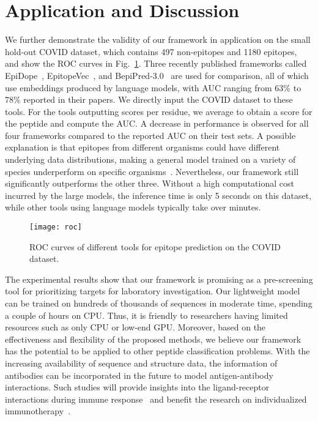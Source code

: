\documentclass[runningheads]{llncs}
\begin{document}
\section{Application and Discussion}
We further demonstrate the validity of our framework in application on the small hold-out COVID dataset, which contains 497 non-epitopes and 1180 epitopes, and show the ROC curves in Fig.~\ref{fig3}. Three recently published frameworks called EpiDope~\cite{collatz2021epidope}, EpitopeVec~\cite{bahai2021epitopevec}, and BepiPred-3.0~\cite{clifford2022bepipred} are used for comparison, all of which use embeddings produced by language models, with AUC ranging from 63\% to 78\% reported in their papers. We directly input the COVID dataset to these tools. For the tools outputting scores per residue, we average to obtain a score for the peptide and compute the AUC. A decrease in performance is observed for all four frameworks compared to the reported AUC on their test sets. A possible explanation is that epitopes from different organisms could have different underlying data distributions, making a general model trained on a variety of species underperform on specific organisms~\cite{ashford2021organism}. Nevertheless, our framework still significantly outperforms the other three. Without a high computational cost incurred by the large models, the inference time is only 5 seconds on this dataset, while other tools using language models typically take over minutes.
\begin{figure}[htbp]
\centerline{\texttt{[image: roc]}}
\caption{ROC curves of different tools for epitope prediction on the COVID dataset.}
\label{fig3}
\end{figure}

The experimental results show that our framework is promising as a pre-screening tool for prioritizing targets for laboratory investigation. Our lightweight model can be trained on hundreds of thousands of sequences in moderate time, spending a couple of hours on CPU. Thus, it is friendly to researchers having limited resources such as only CPU or low-end GPU. Moreover, based on the effectiveness and flexibility of the proposed methods, we believe our framework has the potential to be applied to other peptide classification problems. With the increasing availability of sequence and structure data, the information of antibodies can be incorporated in the future to model antigen-antibody interactions. Such studies will provide insights into the ligand-receptor interactions during immune response~\cite{li2021structure} and benefit the research on individualized immunotherapy~\cite{widrich2020modern}.
\end{document}
